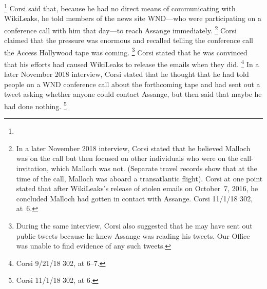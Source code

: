\footnote{}
Corsi said that, because he had no direct means of communicating with WikiLeaks, he told members of the news site WND---who were participating on a conference call with him that day---to reach Assange immediately.%
\footnote{In a later November 2018 interview, Corsi stated  that he believed Malloch was on the call but then focused on other individuals who were on the call-invitation, which Malloch was not.
(Separate travel records show that at the time of the call, Malloch was aboard a transatlantic flight).
Corsi at one point stated that after WikiLeaks's release of stolen emails on October~7, 2016, he concluded Malloch had gotten in contact with Assange.
Corsi 11/1/18 302, at~6.}
Corsi claimed that the pressure was enormous and recalled telling the conference call the Access Hollywood tape was coming.%
\footnote{During the same interview, Corsi also suggested that he may have sent out public tweets because he knew Assange was reading his tweets.
Our Office was unable to find evidence of any such tweets.}
Corsi stated that he was convinced that his efforts had caused WikiLeaks to release the emails when they did.%
\footnote{Corsi 9/21/18 302, at 6--7.}
In a later November 2018 interview, Corsi stated that he thought that he had told people on a WND conference call about the forthcoming tape and had sent out a tweet asking whether anyone could contact Assange, but then said that maybe he had done nothing.%
\footnote{Corsi 11/1/18 302, at 6.}


